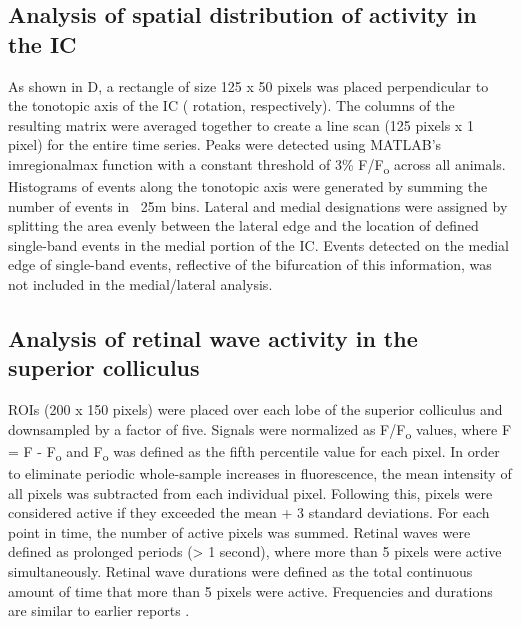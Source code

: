 \documentclass[9pt,lineno]{elife}
\begin{document}
\subsection{Analysis of spatial distribution of activity in the IC}
As shown in D, a rectangle of size 125 x 50 pixels was placed perpendicular to the tonotopic axis of the IC (\textdegree \hspace{0.2mm} rotation, respectively). The columns of the resulting matrix were averaged together to create a line scan (125 pixels x 1 pixel) for the entire time series. Peaks were detected using MATLAB’s imregionalmax function with a constant threshold of 3\% \textDelta F/F\textsubscript{o} across all animals. Histograms of events along the tonotopic axis were generated by summing the number of events in ~25\textmu m bins. Lateral and medial designations were assigned by splitting the area evenly between the lateral edge and the location of defined single-band events in the medial portion of the IC. Events detected on the medial edge of single-band events, reflective of the bifurcation of this information, was not included in the medial/lateral analysis.

\subsection{Analysis of retinal wave activity in the superior colliculus}
ROIs (200 x 150 pixels) were placed over each lobe of the superior colliculus and downsampled by a factor of five. Signals were normalized as \textDelta F/F\textsubscript{o} values, where \textDelta F = F - F\textsubscript{o} and F\textsubscript{o} was defined as the fifth percentile value for each pixel. In order to eliminate periodic whole-sample increases in fluorescence, the mean intensity of all pixels was subtracted from each individual pixel. Following this, pixels were considered active if they exceeded the mean + 3 standard deviations. For each point in time, the number of active pixels was summed. Retinal waves were defined as prolonged periods (> 1 second), where more than 5 pixels were active simultaneously. Retinal wave durations were defined as the total continuous amount of time that more than 5 pixels were active. Frequencies and durations are similar to earlier reports \citep{Ackman2012}.
\end{document}
